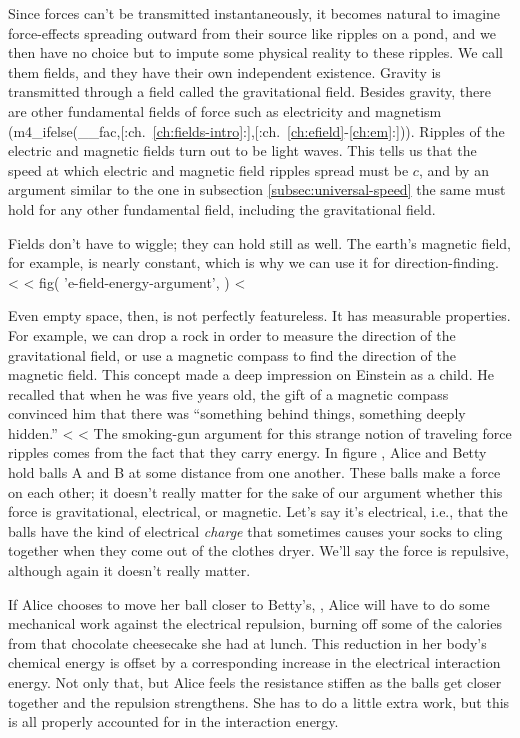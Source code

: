 Since forces can't be transmitted instantaneously, it becomes natural to imagine force-effects
spreading outward from their source like ripples on a pond, and we then have no choice but to
impute some physical reality to these ripples. We call them fields, and they have their own
independent existence. Gravity is transmitted through a field called the gravitational field.
Besides gravity, there are other fundamental fields of force such as electricity and magnetism
(m4_ifelse(__fac,[:ch.~\ref{ch:fields-intro}:],[:ch.~\ref{ch:efield}-\ref{ch:em}:])). Ripples of the electric and magnetic fields
turn out to be light waves. This tells us that the speed at which electric and magnetic field
ripples spread must be $c$, and by an argument similar to the one in subsection
\ref{subsec:universal-speed} the same must hold for any other fundamental field, including
the gravitational field.

Fields don't have to wiggle; they can hold still as well. The earth's magnetic
field, for example, is nearly constant, which is why we can use it for direction-finding.
<%
<%
  fig(
    'e-field-energy-argument',
  )
<%

Even empty space, then, is not perfectly featureless. It has measurable
properties. For example, we can drop a rock in order to measure the direction of the gravitational
field, or use a magnetic compass to find the direction of the magnetic field. This concept made a deep impression
on Einstein as a child. He recalled that
when he was five years old, the gift of a magnetic compass convinced him that there was ``something behind things, something deeply hidden.''
<%
<%
The smoking-gun argument for this strange notion of
traveling force ripples comes from the fact that they carry energy. In figure ,
Alice and Betty hold balls A and B at some distance from one another.
These balls make a force on each other; it doesn't really matter for the sake of our argument
whether this force is gravitational, electrical, or magnetic. Let's say it's electrical, i.e., that the balls
have the kind of electrical \emph{charge} that sometimes causes your socks to cling together when they come out
of the clothes dryer. We'll say the force is repulsive, although again it doesn't really matter.

If Alice chooses to move
her ball closer to Betty's, , Alice will have to do some mechanical work
against the electrical repulsion, burning off some of the calories from that
chocolate cheesecake she had at lunch.
This reduction in
her body's chemical energy is offset by a corresponding increase in the electrical interaction energy.
Not only that, but Alice feels the resistance stiffen as the balls get closer together
and the repulsion strengthens. 
She has to do a little extra work, but this is all properly accounted for in the interaction energy.

